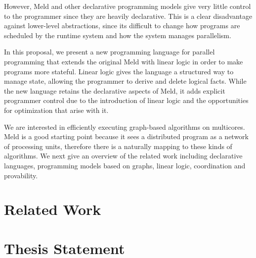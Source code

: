 However, Meld and other declarative programming models give very little control to the programmer since they are heavily declarative.
This is a clear disadvantage against lower-level abstractions, since its difficult to change how programs are scheduled by
the runtime system and how the system manages parallelism.

In this proposal, we present a new programming language for parallel programming that extends the
original Meld with linear logic in order to make programs more stateful. Linear logic gives the language a structured
way to manage state, allowing the programmer to derive and delete logical facts.
While the new language retains the declarative aspects of Meld, it adds explicit programmer control
due to the introduction of linear logic and the opportunities for optimization that arise with it.

We are interested in efficiently executing graph-based algorithms on multicores. Meld is a good
starting point because it sees a distributed program as a network of processing units, therefore
there is a naturally mapping to these kinds of algorithms.
We next give an overview of the related work including declarative languages, programming models
based on graphs, linear logic, coordination and provability.

\section{Related Work}



\section{Thesis Statement}



